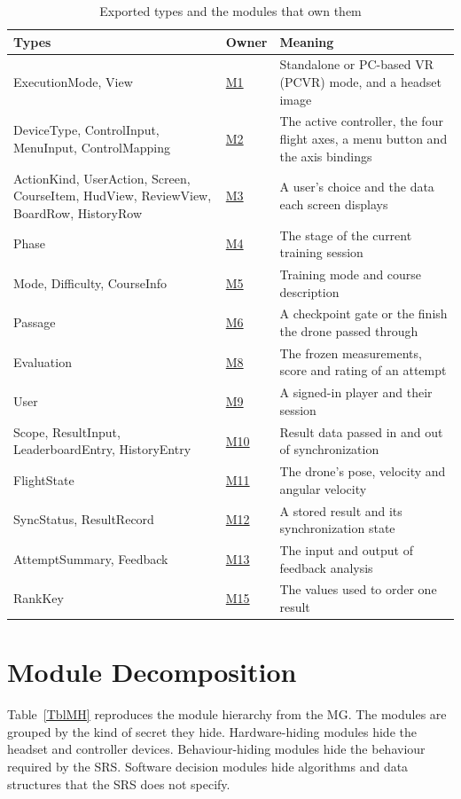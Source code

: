 \documentclass[12pt, titlepage]{article}
\newcommand{\Mref}[1]{\hyperref[sec:M#1]{M#1}}
\begin{document}
\begin{table}[h!]
\centering
\renewcommand{\arraystretch}{1.15}
\begin{tabularx}{\textwidth}{>{\raggedright\arraybackslash}p{5.6cm} l
>{\raggedright\arraybackslash}X}
\toprule
\textbf{Types} & \textbf{Owner} & \textbf{Meaning}\\
\midrule
ExecutionMode, View & \Mref{1} & Standalone or PC-based VR (PCVR) mode, and
a headset image\\
DeviceType, ControlInput, MenuInput, ControlMapping & \Mref{2} & The active
controller, the four flight axes, a menu button and the axis bindings\\
ActionKind, UserAction, Screen, CourseItem, HudView, ReviewView, BoardRow,
HistoryRow & \Mref{3} & A user's choice and the data each screen displays\\
Phase & \Mref{4} & The stage of the current training session\\
Mode, Difficulty, CourseInfo & \Mref{5} & Training mode and course description\\
Passage & \Mref{6} & A checkpoint gate or the finish the drone passed through\\
Evaluation & \Mref{8} & The frozen measurements, score and rating of an
attempt\\
User & \Mref{9} & A signed-in player and their session\\
Scope, ResultInput, LeaderboardEntry, HistoryEntry & \Mref{10} & Result data
passed in and out of synchronization\\
FlightState & \Mref{11} & The drone's pose, velocity and angular velocity\\
SyncStatus, ResultRecord & \Mref{12} & A stored result and its synchronization
state\\
AttemptSummary, Feedback & \Mref{13} & The input and output of feedback
analysis\\
RankKey & \Mref{15} & The values used to order one result\\
\bottomrule
\end{tabularx}
\caption{Exported types and the modules that own them}
\label{TblTypes}
\end{table}

\section{Module Decomposition} \label{SecMD}

Table~\ref{TblMH} reproduces the module hierarchy from the MG.
The modules are grouped by the kind of secret they hide. Hardware-hiding modules
hide the headset and controller devices. Behaviour-hiding modules hide the
behaviour required by the SRS. Software decision modules hide algorithms and
data structures that the SRS does not specify.
\end{document}
